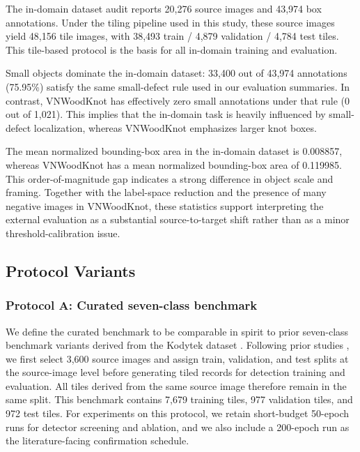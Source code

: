\documentclass[journal,article,submit,moreauthors,pdftex]{Definitions/tsp}
\begin{document}
The in-domain dataset audit reports 20,276 source images and 43,974 box annotations. Under the tiling pipeline used in this study, these source images yield 48,156 tile images, with 38,493 train / 4,879 validation / 4,784 test tiles. This tile-based protocol is the basis for all in-domain training and evaluation.

Small objects dominate the in-domain dataset: 33,400 out of 43,974 annotations (75.95\%) satisfy the same small-defect rule used in our evaluation summaries. In contrast, VNWoodKnot has effectively zero small annotations under that rule (0 out of 1,021). This implies that the in-domain task is heavily influenced by small-defect localization, whereas VNWoodKnot emphasizes larger knot boxes.

The mean normalized bounding-box area in the in-domain dataset is 0.008857, whereas VNWoodKnot has a mean normalized bounding-box area of 0.119985. This order-of-magnitude gap indicates a strong difference in object scale and framing. Together with the label-space reduction and the presence of many negative images in VNWoodKnot, these statistics support interpreting the external evaluation as a substantial source-to-target shift rather than as a minor threshold-calibration issue.

\subsection{Protocol Variants}
\label{sec:protocol}

\subsubsection{Protocol A: Curated seven-class benchmark}
We define the curated benchmark to be comparable in spirit to prior seven-class benchmark variants derived from the Kodytek dataset \citep{kodytek_dataset}. Following prior studies \citep{odca_yolo,bpn_yolo,sim_yolo,fdd_yolo,an_cwb_yolov8}, we first select 3,600 source images and assign train, validation, and test splits at the source-image level before generating tiled records for detection training and evaluation. All tiles derived from the same source image therefore remain in the same split. This benchmark contains 7,679 training tiles, 977 validation tiles, and 972 test tiles. For experiments on this protocol, we retain short-budget 50-epoch runs for detector screening and ablation, and we also include a 200-epoch run as the literature-facing confirmation schedule.
\end{document}
